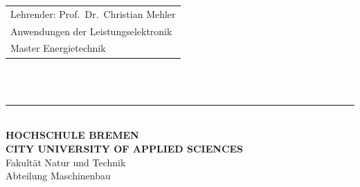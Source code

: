 \begin{titlepage}
    \hspace*{37mm}
    \begin{minipage}{0.5\linewidth}
      \begin{tabular}{@{}l}
        Lehrender: Prof.\ Dr.\ Christian Mehler \\
        Anwendungen der Leistungselektronik  \\
        Master Energietechnik \\
      \end{tabular}\\
  
      \,\rule{9mm}{1mm}\\[1.5mm]
  
      \textbf{HOCHSCHULE BREMEN}\\
      \textbf{CITY UNIVERSITY OF APPLIED SCIENCES}\\
      Fakultät Natur und Technik\\
      Abteilung Maschinenbau\\
    \end{minipage}
  \end{titlepage}
  \restoregeometry
  \thispagestyle{empty}
  
